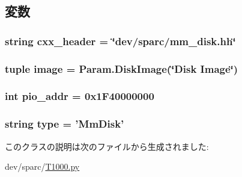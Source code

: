 \subsection{変数}
\hypertarget{classT1000_1_1MmDisk_a17da7064bc5c518791f0c891eff05fda}{
\subsubsection[{cxx\_\-header}]{\setlength{\rightskip}{0pt plus 5cm}string {\bf cxx\_\-header} = \char`\"{}dev/sparc/mm\_\-disk.hh\char`\"{}}}
\label{classT1000_1_1MmDisk_a17da7064bc5c518791f0c891eff05fda}
\hypertarget{classT1000_1_1MmDisk_a19b24a8d47d783aaa13170884d6a25c2}{
\subsubsection[{image}]{\setlength{\rightskip}{0pt plus 5cm}tuple {\bf image} = Param.DiskImage(\char`\"{}Disk Image\char`\"{})}}
\label{classT1000_1_1MmDisk_a19b24a8d47d783aaa13170884d6a25c2}
\hypertarget{classT1000_1_1MmDisk_a659450bdbf05cdba8edf24c47df67671}{
\subsubsection[{pio\_\-addr}]{\setlength{\rightskip}{0pt plus 5cm}int {\bf pio\_\-addr} = 0x1F40000000}}
\label{classT1000_1_1MmDisk_a659450bdbf05cdba8edf24c47df67671}
\hypertarget{classT1000_1_1MmDisk_acce15679d830831b0bbe8ebc2a60b2ca}{
\subsubsection[{type}]{\setlength{\rightskip}{0pt plus 5cm}string {\bf type} = '{\bf MmDisk}'}}
\label{classT1000_1_1MmDisk_acce15679d830831b0bbe8ebc2a60b2ca}


このクラスの説明は次のファイルから生成されました:\begin{DoxyCompactItemize}
\item 
dev/sparc/\hyperlink{T1000_8py}{T1000.py}\end{DoxyCompactItemize}
